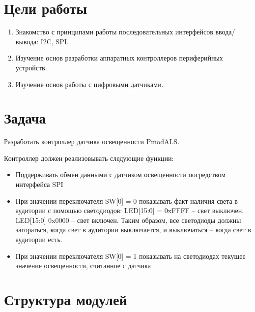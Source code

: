 

\usepackage{graphicx}
\fancyhead[LR]{}

\def \labnum {2}
\def \labsubj {Схемотехника ЭВМ}
\def \labauthor {Айтуганов Д. А. \\ Чебыкин И. Б.}
\def \labgroup {P3301}
\def \labinsp {Баевских А. Н.}
\def \labname {Вариант: 2}

\isnametrue
\lstset{
	caption=\lstname,
	basicstyle=\ttfamily\selectfont\scriptsize
}



\tableofcontents
\newpage
\section{Цели работы}
\begin{enumerate}
\item Знакомство с принципами работы последовательных интерфейсов ввода/вывода: I2C, SPI.
\item Изучение основ разработки аппаратных контроллеров периферийных устройств.
\item Изучение основ работы с цифровыми датчиками.
\end{enumerate}

\section{Задача}
Разработать контроллер датчика освещенности PmodALS.

Контроллер должен реализовывать следующие функции:
\begin{itemize}
\item Поддерживать обмен данными с датчиком освещенности посредством интерфейса SPI
\item При значении переключателя SW[0] = 0 показывать факт наличия света в
аудитории с помощью светодиодов: LED[15:0] = 0xFFFF – свет выключен,
LED[15:0] 0x0000 – свет включен. Таким образом, все светодиоды должны
загораться, когда свет в аудитории выключается, и выключаться – когда свет в
аудитории есть.
\item При значении переключателя SW[0] = 1 показывать на светодиодах текущее
значение освещенности, считанное с датчика
\end{itemize}

\section{Структура модулей}


